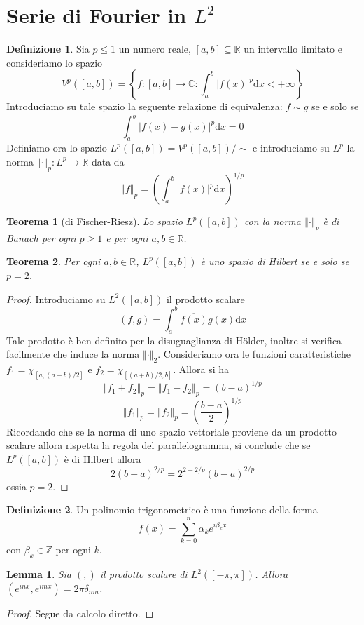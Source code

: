 \documentclass[a4paper,11pt]{book}
\newcommand{\dif}{\mathrm{d}}
\newcommand{\R}{\mathbb{R}}
\newcommand{\C}{\mathbb{C}}
\newcommand{\norm}[1]{\left\Vert#1\right\Vert}
\theoremstyle{theorem}
\newtheorem{teorema}{Teorema}[section]
\newtheorem{lemma}{Lemma}[section]
\theoremstyle{definition}
\newtheorem{definizione}{Definizione}[section]
\begin{document}
\section{Serie di Fourier in $L^2$}
\begin{definizione}
	Sia $p\leq1$ un numero reale, $[a,b]\subseteq\R$ un intervallo limitato e consideriamo lo spazio
	\[V^p([a,b])=\left\{f\colon[a,b]\to\C:\int_{a}^{b}|f(x)|^p\dif x<+\infty\right\}\]
	Introduciamo su tale spazio la seguente relazione di equivalenza: $f\sim g$ se e solo se
	\[\int_{a}^{b}|f(x)-g(x)|^p\dif x=0\]
	Definiamo ora lo spazio $L^p([a,b])=V^p([a,b])/\sim$ e introduciamo su $L^p$ la norma $\norm{\cdot}_p\colon L^p\to\R$ data da
	\[\norm{f}_p=\left(\int_{a}^{b}|f(x)|^p\dif x\right)^{1/p}\]
\end{definizione}
\begin{teorema}[di Fischer-Riesz]
		Lo spazio $L^p([a,b])$ con la norma $\norm{\cdot}_p$ è di Banach per ogni $p\geq1$ e per ogni $a,b\in\R$.
\end{teorema}
\begin{teorema}
	Per ogni $a,b\in\R$, $L^p([a,b])$ è uno spazio di Hilbert se e solo se $p=2$.
\end{teorema}
\begin{proof}
	Introduciamo su $L^2([a,b])$ il prodotto scalare
	\[(f,g)=\int_{a}^{b}\overline{f(x)}g(x)\dif x\]
	Tale prodotto è ben definito per la disuguaglianza di H\"older, inoltre si verifica facilmente che induce la norma $\norm{\cdot}_2$. Consideriamo ora le funzioni caratteristiche $f_1=\chi_{[a,(a+b)/2]}$ e $f_2=\chi_{[(a+b)/2,b]}$. Allora si ha
	\[\norm{f_1+f_2}_p=\norm{f_1-f_2}_p=(b-a)^{1/p}\]
	\[\norm{f_1}_p=\norm{f_2}_p=\left(\frac{b-a}{2}\right)^{1/p}\]
	Ricordando che se la norma di uno spazio vettoriale proviene da un prodotto scalare allora rispetta la regola del parallelogramma, si conclude che se $L^p([a,b])$ è di Hilbert allora
	\[2(b-a)^{2/p}=2^{2-2/p}(b-a)^{2/p}\]
	ossia $p=2$.
\end{proof}
\begin{definizione}
	Un polinomio trigonometrico è una funzione della forma
	\[f(x)=\sum_{k=0}^{n}\alpha_ke^{i\beta_kx}\]
	con $\beta_k\in\mathbb{Z}$ per ogni $k$.
\end{definizione}
\begin{lemma}
	Sia $(,)$ il prodotto scalare di $L^2([-\pi,\pi])$. Allora $(e^{inx},e^{imx})=2\pi\delta_{nm}$.
\end{lemma}
\begin{proof}
	Segue da calcolo diretto.
\end{proof}
\end{document}
